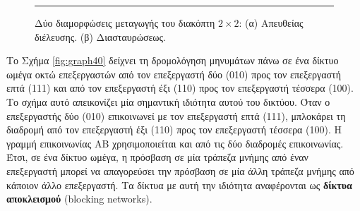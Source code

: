 \documentclass[12pt,a4paper]{article}
\begin{document}
\begin{figure}[H]
\centering
{}
\noindent\rule{\textwidth}{0.2pt}
\caption{Δύο διαμορφώσεις μεταγωγής του διακόπτη $2 \times 2$:
(α) Απευθείας διέλευσης.
(β) Διασταυρώσεως.}
\label{fig:graph38}
\end{figure}
\vspace{0.3cm}

Το Σχήμα \ref{fig:graph40} δείχνει τη δρομολόγηση μηνυμάτων πάνω σε ένα 
δίκτυο ωμέγα οκτώ επεξεργαστών από τον επεξεργαστή δύο (010) προς τον 
επεξεργαστή επτά (111) και από τον επεξεργαστή έξι (110) προς τον 
επεξεργαστή τέσσερα (100). Το σχήμα αυτό απεικονίζει μία σημαντική 
ιδιότητα αυτού του δικτύου. Όταν ο επεξεργαστής δύο (010) επικοινωνεί με 
τον επεξεργαστή επτά (111), μπλοκάρει τη διαδρομή από τον επεξεργαστή έξι 
(110) προς τον επεξεργαστή τέσσερα (100). Η γραμμή επικοινωνίας ΑΒ 
χρησιμοποιείται και από τις δύο διαδρομές επικοινωνίας. Έτσι, σε ένα 
δίκτυο ωμέγα, η πρόσβαση σε μία τράπεζα μνήμης από έναν επεξεργαστή μπορεί 
να απαγορεύσει την πρόσβαση σε μία άλλη τράπεζα μνήμης από κάποιον άλλο 
επεξεργαστή. Τα δίκτυα με αυτή την ιδιότητα αναφέρονται ως \textbf{δίκτυα αποκλεισμού} 
(\foreignlanguage{english}{blocking networks}).
\end{document}
